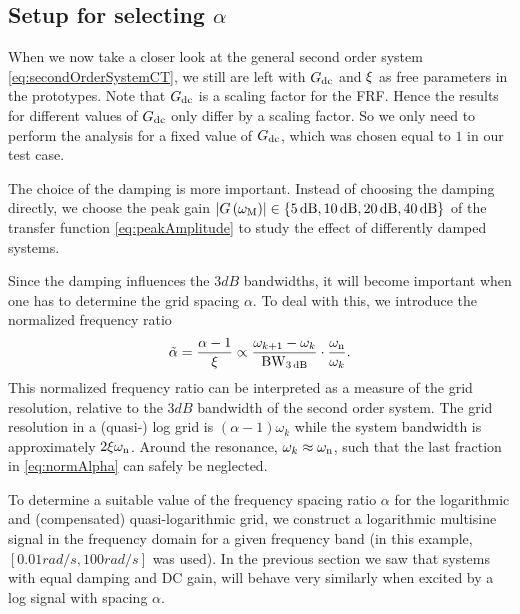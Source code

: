   \subsection{Setup for selecting $\alpha$}
  When we now take a closer look at the general second order system \eqref{eq:secondOrderSystemCT}, we still are left with $G_{\mathrm{dc}}$ and $\xi$ as free parameters in the prototypes.
  Note that $G_{\mathrm{dc}}$ is a scaling factor for the FRF.
  Hence the results for different values of $G_{\mathrm{dc}}$ only differ by a scaling factor.
  So we only need to perform the analysis for a fixed value of $G_{\mathrm{dc}}$, which was chosen equal to $1$ in our test case.

  The choice of the damping is more important.
  Instead of choosing the damping directly, we choose the peak gain $\left| G\left( \omega_{\mathrm{M}} \right) \right| \in \left\{5 \,\mathrm{dB}, 10 \,\mathrm{dB}, 20 \,\mathrm{dB}, 40 \,\mathrm{dB} \right\}$ of the transfer function \eqref{eq:peakAmplitude} to study the effect of differently damped systems.

  Since the damping influences the $3\unit{dB}$ bandwidths, it will become important when one has to determine the grid spacing $\alpha$.
  To deal with this, we introduce the normalized frequency ratio
  \begin{equation}
    \tilde{\alpha} = \frac{\alpha - 1}
                          {\xi}
                   \propto \frac{\omega_{k+1} - \omega_k}
                                {\mathrm{BW}_{3\,\mathrm{dB}}}
                           \cdot
                           \frac{\omega_{\mathrm{n}}}{\omega_k}
    \text{.}
    \label{eq:normAlpha} 
  \end{equation}
  This normalized frequency ratio can be interpreted as a measure of the grid resolution, relative to the $3\unit{dB}$ bandwidth of the second order system.
  The grid resolution in a (quasi-) log grid is $\left( \alpha - 1\right)\omega_k$ while the system bandwidth is approximately $2\xi\omega_{\mathrm{n}}$.
  Around the resonance, $\omega_k \approx \omega_{\mathrm{n}}$, such that the last fraction in \eqref{eq:normAlpha} can safely be neglected.
  
  To determine a suitable value of the frequency spacing ratio $\alpha$ for the logarithmic and (compensated) quasi-logarithmic grid, we construct a logarithmic multisine signal in the frequency domain for a given frequency band (in this example, $\left[ 0.01 \unit{rad/s}, 100 \unit{rad/s}\right]$ was used).
  In the previous section we saw that systems with equal damping and DC gain, will behave very similarly when excited by a log signal with spacing $\alpha$.

